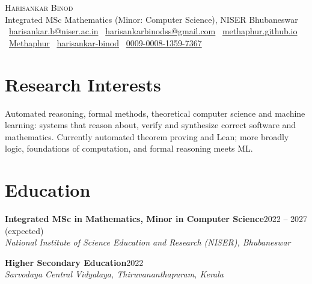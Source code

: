 \documentclass[11pt,a4paper]{article}
\newcommand{\cventry}[4]{%
  \textbf{#1}\hfill{\color{muted}#2}\\
  \textit{#3}%
  \if\relax\detokenize{#4}\relax\else\par\vspace{1pt}#4\fi
  \par\vspace{3pt}%
}
\newcommand{\sep}{\enspace{\color{muted}$\cdot$}\enspace}
\begin{document}
\begin{center}
  {\fontsize{24}{28}\selectfont\scshape Harisankar Binod}\\[4pt]
  {\color{muted}Integrated MSc Mathematics (Minor: Computer Science), NISER Bhubaneswar}\\[5pt]
  \small
  \faEnvelope\ \href{mailto:harisankar.b@niser.ac.in}{harisankar.b@niser.ac.in}\sep
  \faEnvelope[regular]\ \href{mailto:harisankarbinodss@gmail.com}{harisankarbinodss@gmail.com}\sep
  \faGlobe\ \href{https://methaphur.github.io}{methaphur.github.io}\\[2pt]
  \faGithub\ \href{https://github.com/Methaphur}{Methaphur}\sep
  \faLinkedin\ \href{https://www.linkedin.com/in/harisankar-binod}{harisankar-binod}\sep
  \aiOrcid\ \href{https://orcid.org/0009-0008-1359-7367}{0009-0008-1359-7367}
\end{center}
\vspace{-4pt}

\section{Research Interests}
Automated reasoning, formal methods, theoretical computer science and machine learning: systems that
reason about, verify and synthesize correct software and mathematics. Currently automated theorem
proving and Lean; more broadly logic, foundations of computation, and formal reasoning meets ML.

\section{Education}
\cventry{Integrated MSc in Mathematics, Minor in Computer Science}{2022 -- 2027 (expected)}
  {National Institute of Science Education and Research (NISER), Bhubaneswar}{}
\cventry{Higher Secondary Education}{2022}
  {Sarvodaya Central Vidyalaya, Thiruvananthapuram, Kerala}{}

\end{document}
